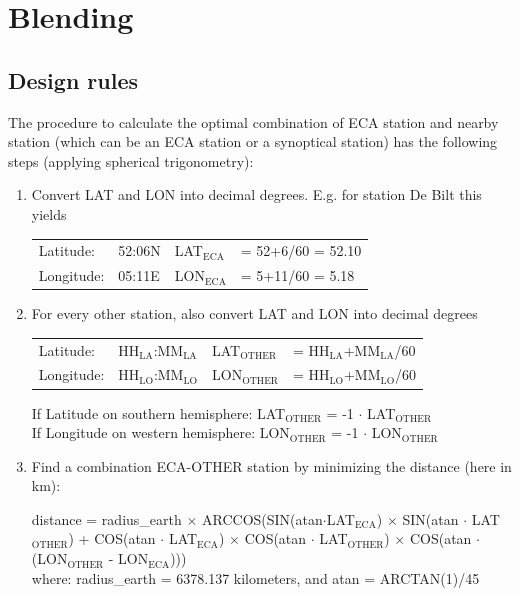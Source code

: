 \documentclass[a4paper,11pt]{article}
\begin{document}
\section{Blending}
\label{sec:blending}

\subsection{Design rules}
\label{sec:blendrules}

The procedure to calculate the optimal combination of ECA station and
nearby station (which can be an ECA station or a synoptical station)
has the following steps (applying spherical trigonometry):

\begin{enumerate}
\item Convert LAT and LON into decimal degrees. E.g. for station De
  Bilt this yields\\ 
\medskip

\begin{tabular}{l l l l}
Latitude:& 52:06N & LAT$_{\textrm{ECA}}$ &= 52+6/60 = 52.10\\
Longitude: &05:11E & LON$_{\textrm{ECA}}$ &= 5+11/60 = 5.18
\end{tabular}
\medskip

\item For every other station, also convert LAT and LON into decimal
degrees\\
\medskip

\begin{tabular}{l l l l}
Latitude: & HH$_{\textrm{LA}}$:MM$_{\textrm{LA}}$ &
LAT$_{\textrm{OTHER}}$ &= HH$_{\textrm{LA}}$+MM$_{\textrm{LA}}$/60\\
Longitude:& HH$_{\textrm{LO}}$:MM$_{\textrm{LO}}$ &
LON$_{\textrm{OTHER}}$ &= HH$_{\textrm{LO}}$+MM$_{\textrm{LO}}$/60
\end{tabular}
\medskip

If Latitude on southern hemisphere: LAT$_{\textrm{OTHER}}$ = -1 $\cdot$
LAT$_{\textrm{OTHER}}$\\
If Longitude on western hemisphere: LON$_{\textrm{OTHER}}$ = -1 $\cdot$ LON$_{\textrm{OTHER}}$
\medskip

\item Find a combination ECA-OTHER station by minimizing the distance
(here in km):
\medskip

 distance = radius\_earth $\times$
ARCCOS(SIN(atan$\cdot$LAT$_{\textrm{ECA}}$) $\times$
SIN(atan $\cdot$ LAT$_{\textrm{OTHER}}$) +
COS(atan $\cdot$ LAT$_{\textrm{ECA}}$) $\times$
COS(atan $\cdot$ LAT$_{\textrm{OTHER}}$) $\times$
COS(atan $\cdot$ (LON$_{\textrm{OTHER}}$ - LON$_{\textrm{ECA}}$)))\\
where: radius\_earth = 6378.137 kilometers, and atan = ARCTAN(1)/45
\medskip


\end{enumerate}
\end{document}
